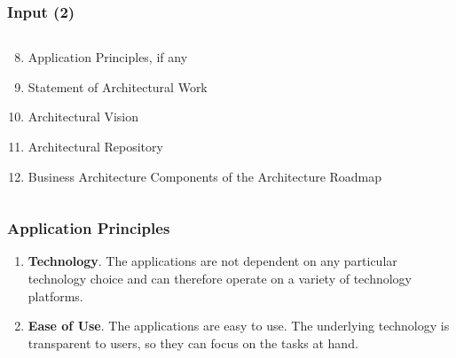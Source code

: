 \documentclass[aspectratio=169, table]{beamer}
\begin{document}
    \begin{frame}
        \frametitle{Input (2)}
        \begin{columns}
            \begin{column}{0.5\textwidth}
                \begin{enumerate}
                    \setcounter{enumi}{7}
                    \item Application Principles, if any
                    \item Statement of Architectural Work
                    \item Architectural Vision
                    \item Architectural Repository
                    \item Business Architecture Components of the Architecture Roadmap
                \end{enumerate}
            \end{column}
            \begin{column}{0.5\textwidth}
                \setcounter{enumi}{14}
            \end{column}
        \end{columns}
    \end{frame}

    \begin{frame}
        \frametitle{Application Principles}
        \begin{enumerate}
            \item \textbf{Technology}.
            The applications are not dependent on any particular technology choice and can therefore operate on a variety of technology platforms.
            \item \textbf{Ease of Use}.
            The applications are easy to use. The underlying technology is transparent to users, so they can focus on the tasks at hand.
        \end{enumerate}
    \end{frame}
\end{document}
